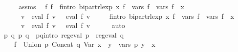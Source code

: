 \begin{isabellebody}
%
\isadelimproof
%
\endisadelimproof
%
\isatagproof
{}\isamarkupfalse%
\ {\isacharminus}{\kern0pt}\isanewline
\ \ \isamarkupfalse%
\ assms\ \isamarkupfalse%
\ f{}{\isacharprime}{\kern0pt}\ f{}{\isacharprime}{\kern0pt}\ \ f{}{\isacharprime}{\kern0pt}{\isacharunderscore}{\kern0pt}intro{\isacharcolon}{\kern0pt}\ {\isachardoublequoteopen}bipart{\isacharunderscore}{\kern0pt}rlexp\ x\ f{}{\isacharprime}{\kern0pt}\ {\isasymand}\ vars\ f{}{\isacharprime}{\kern0pt}\ {\isacharequal}{\kern0pt}\ vars\ f{}\ {\isasymunion}\ {\isacharbraceleft}{\kern0pt}x{\isacharbraceright}{\kern0pt}\ {\isasymand}\isanewline
\ \ \ \ \ \ {\isacharparenleft}{\kern0pt}{\isasymforall}v{\isachardot}{\kern0pt}\ {\isasymPsi}\ {\isacharparenleft}{\kern0pt}eval\ f{}\ v{\isacharparenright}{\kern0pt}\ {\isacharequal}{\kern0pt}\ {\isasymPsi}\ {\isacharparenleft}{\kern0pt}eval\ f{}{\isacharprime}{\kern0pt}\ v{\isacharparenright}{\kern0pt}{\isacharparenright}{\kern0pt}{\isachardoublequoteclose}\isanewline
\ \ \ \ \ f{}{\isacharprime}{\kern0pt}{\isacharunderscore}{\kern0pt}intro{\isacharcolon}{\kern0pt}\ {\isachardoublequoteopen}bipart{\isacharunderscore}{\kern0pt}rlexp\ x\ f{}{\isacharprime}{\kern0pt}\ {\isasymand}\ vars\ f{}{\isacharprime}{\kern0pt}\ {\isacharequal}{\kern0pt}\ vars\ f{}\ {\isasymunion}\ {\isacharbraceleft}{\kern0pt}x{\isacharbraceright}{\kern0pt}\ {\isasymand}\isanewline
\ \ \ \ \ \ {\isacharparenleft}{\kern0pt}{\isasymforall}v{\isachardot}{\kern0pt}\ {\isasymPsi}\ {\isacharparenleft}{\kern0pt}eval\ f{}\ v{\isacharparenright}{\kern0pt}\ {\isacharequal}{\kern0pt}\ {\isasymPsi}\ {\isacharparenleft}{\kern0pt}eval\ f{}{\isacharprime}{\kern0pt}\ v{\isacharparenright}{\kern0pt}{\isacharparenright}{\kern0pt}{\isachardoublequoteclose}\isanewline
\ \ \ \ \isamarkupfalse%
\ auto\isanewline
\ \ \isamarkupfalse%
\ \isamarkupfalse%
\ p{}\ q{}\ p{}\ q{}\ \ p{}{\isacharunderscore}{\kern0pt}q{}{\isacharunderscore}{\kern0pt}intro{\isacharcolon}{\kern0pt}\ {\isachardoublequoteopen}reg{\isacharunderscore}{\kern0pt}eval\ p{}\ {\isasymand}\ reg{\isacharunderscore}{\kern0pt}eval\ q{}\ {\isasymand}\isanewline
\ \ \ \ f{}{\isacharprime}{\kern0pt}\ {\isacharequal}{\kern0pt}\ Union\ p{}\ {\isacharparenleft}{\kern0pt}Concat\ q{}\ {\isacharparenleft}{\kern0pt}Var\ x{\isacharparenright}{\kern0pt}{\isacharparenright}{\kern0pt}\ {\isasymand}\ {\isacharparenleft}{\kern0pt}{\isasymforall}y\ {\isasymin}\ vars\ p{}{\isachardot}{\kern0pt}\ y\ {\isasymnoteq}\ x{\isacharparenright}{\kern0pt}{\isachardoublequoteclose}\isanewline

\end{isabellebody}
